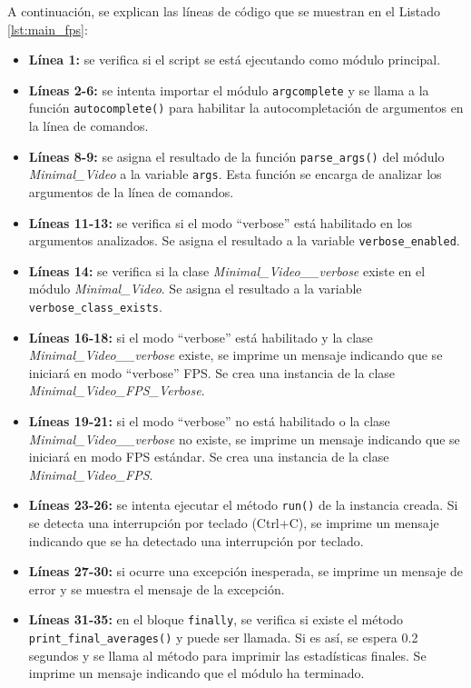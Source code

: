 A continuación, se explican las líneas de código que se muestran en el Listado \ref{lst:main_fps}:
\begin{itemize}
    \item \textbf{Línea 1:} se verifica si el script se está ejecutando como módulo principal.
    \item \textbf{Líneas 2-6:} se intenta importar el módulo \texttt{argcomplete} y se llama a la función \texttt{autocomplete()} para habilitar la autocompletación de argumentos en la línea de comandos.
    \item \textbf{Líneas 8-9:} se asigna el resultado de la función \texttt{parse\_args()} del módulo \textit{Minimal\_Video} a la variable \texttt{args}. Esta función se encarga de analizar los argumentos de la línea de comandos.
    \item \textbf{Líneas 11-13:} se verifica si el modo ``verbose'' está habilitado en los argumentos analizados. Se asigna el resultado a la variable \texttt{verbose\_enabled}.
    \item \textbf{Líneas 14:} se verifica si la clase \textit{Minimal\_Video\_\_verbose} existe en el módulo \textit{Minimal\_Video}. Se asigna el resultado a la variable \texttt{verbose\_class\_exists}.
    \item \textbf{Líneas 16-18:} si el modo ``verbose'' está habilitado y la clase \textit{Minimal\_Video\_\_verbose} existe, se imprime un mensaje indicando que se iniciará en modo ``verbose'' FPS. Se crea una instancia de la clase \textit{Minimal\_Video\_FPS\_Verbose}.
    \item \textbf{Líneas 19-21:} si el modo ``verbose'' no está habilitado o la clase \textit{Minimal\_Video\_\_verbose} no existe, se imprime un mensaje indicando que se iniciará en modo FPS estándar. Se crea una instancia de la clase \textit{Minimal\_Video\_FPS}.
    \item \textbf{Líneas 23-26:} se intenta ejecutar el método \texttt{run()} de la instancia creada. Si se detecta una interrupción por teclado (Ctrl+C), se imprime un mensaje indicando que se ha detectado una interrupción por teclado.
    \item \textbf{Líneas 27-30:} si ocurre una excepción inesperada, se imprime un mensaje de error y se muestra el mensaje de la excepción.
    \item \textbf{Líneas 31-35:} en el bloque \texttt{finally}, se verifica si existe el método \texttt{print\_final\_averages()} y puede ser llamada. Si es así, se espera 0.2 segundos y se llama al método para imprimir las estadísticas finales. Se imprime un mensaje indicando que el módulo ha terminado.
\end{itemize}
\vspace{\baselineskip}

